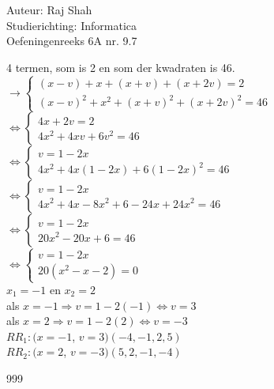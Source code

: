 \documentclass[a4paper]{article}
\begin{document}
  
\noindent \large Auteur: Raj Shah \\
\noindent \large Studierichting: Informatica\\
\noindent \large Oefeningenreeks 6A nr. 9.7\\

\medskip

\normalsize

4 termen, som is 2 en som der kwadraten is 46.\\

$\rightarrow
 \left\{
	\begin{array}{l}
	(x-v) + x  +  (x+v) + (x+2v) = 2\\
	(x-v)^2 +x^2  +  (x+v)^2 + (x+2v)^2 = 46
	\end{array}
 \right. $\\
 
 
 $ \Leftrightarrow 
  \left\{
	\begin{array}{l}
	4x + 2v = 2\\
	4x^2 + 4xv + 6v^2 = 46
	\end{array}
 \right. $\\
 
 $ \Leftrightarrow 
  \left\{
	\begin{array}{l}
	v = 1 -2x\\
	4x^2 + 4x(1-2x) + 6(1-2x)^2 = 46
	\end{array}
 \right. $ \\
 
  $ \Leftrightarrow 
  \left\{
	\begin{array}{l}
	v = 1 -2x\\
	4x^2 +4x -8x^2 + 6 -24x +24x^2 = 46
	\end{array}
 \right. $\\
 
   $ \Leftrightarrow 
  \left\{
	\begin{array}{l}
	v = 1 -2x\\
	20x^2 - 20x + 6 = 46
	\end{array}
 \right. $\\
 
   $ \Leftrightarrow 
  \left\{
	\begin{array}{l}
	v = 1 -2x\\
	20(x^2 - x -2) = 0
	\end{array}
 \right. $\\
 
 $x_{1} = -1$ en $x_{2} = 2$\\
 
 als $x = -1 \Rightarrow v = 1-2(-1) \Leftrightarrow v = 3$\\
 
 als $x = 2 \Rightarrow v = 1-2(2) \Leftrightarrow v = -3$\\

$RR_1 : (x = -1$, $v = 3)( -4, -1, 2, 5)$\\

$RR_2 : (x = 2$, $v = -3)(5, 2, -1, -4)$\\

\begin{thebibliography}{999}
\end{thebibliography}
\end{document}
